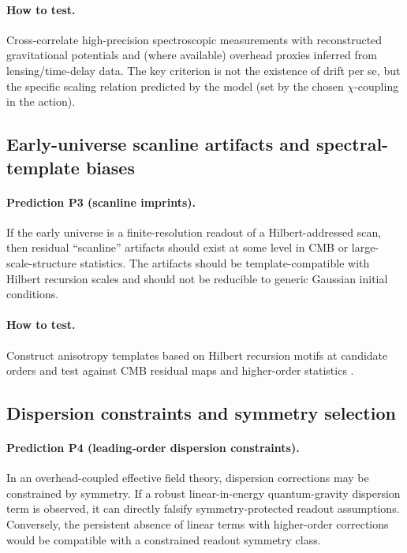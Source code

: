 \paragraph{How to test.}
Cross-correlate high-precision spectroscopic measurements with reconstructed gravitational potentials and (where available) overhead proxies inferred from lensing/time-delay data.
The key criterion is not the existence of drift per se, but the specific scaling relation predicted by the model (set by the chosen $\chi$-coupling in the action).

\subsection{Early-universe scanline artifacts and spectral-template biases}
\label{subsec:test_scanline}

\paragraph{Prediction P3 (scanline imprints).}
If the early universe is a finite-resolution readout of a Hilbert-addressed scan, then residual ``scanline'' artifacts should exist at some level in CMB or large-scale-structure statistics.
The artifacts should be template-compatible with Hilbert recursion scales and should not be reducible to generic Gaussian initial conditions.

\paragraph{How to test.}
Construct anisotropy templates based on Hilbert recursion motifs at candidate orders and test against CMB residual maps and higher-order statistics \cite{Planck2018Isotropy}.

\subsection{Dispersion constraints and symmetry selection}
\label{subsec:test_dispersion}

\paragraph{Prediction P4 (leading-order dispersion constraints).}
In an overhead-coupled effective field theory, dispersion corrections may be constrained by symmetry.
If a robust linear-in-energy quantum-gravity dispersion term is observed, it can directly falsify symmetry-protected readout assumptions.
Conversely, the persistent absence of linear terms with higher-order corrections would be compatible with a constrained readout symmetry class.
\cite{Mattingly2005,JacobsonLiberatiMattingly2006}

